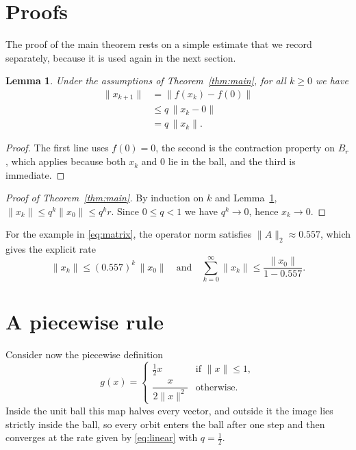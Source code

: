 \documentclass[10pt]{article}
\newtheorem{lemma}[theorem]{Lemma}
\theoremstyle{definition}
\begin{document}
\clearpage
\section{Proofs}

The proof of the main theorem rests on a simple estimate that we record
separately, because it is used again in the next section.

\begin{lemma}\label{lem:step}
Under the assumptions of Theorem~\ref{thm:main}, for all $k\ge 0$ we have
\begin{align}
  \|x_{k+1}\| &= \|f(x_k)-f(0)\|   \label{eq:step1}\\
              &\le q\,\|x_k-0\|    \label{eq:step2}\\
              &= q\,\|x_k\| .      \label{eq:step3}
\end{align}
\end{lemma}

\begin{proof}
The first line uses $f(0)=0$, the second is the contraction property on
$B_r$, which applies because both $x_k$ and $0$ lie in the ball, and the
third is immediate.
\end{proof}

\begin{proof}[Proof of Theorem~\ref{thm:main}]
By induction on $k$ and Lemma~\ref{lem:step}, $\|x_k\|\le q^k\|x_0\|\le
q^k r$. Since $0\le q<1$ we have $q^k\to 0$, hence $x_k\to 0$.
\end{proof}

For the example in \eqref{eq:matrix}, the operator norm satisfies
$\|A\|_2\approx 0.557$, which gives the explicit rate
\begin{equation}
  \|x_k\| \le (0.557)^k\,\|x_0\|
  \quad\text{and}\quad
  \sum_{k=0}^{\infty}\|x_k\| \le \frac{\|x_0\|}{1-0.557} .
  \label{eq:rate}
\end{equation}

\section{A piecewise rule}

Consider now the piecewise definition
\begin{equation}
  g(x) =
  \begin{cases}
    \tfrac12 x & \text{if } \|x\|\le 1,\\[2pt]
    \dfrac{x}{2\|x\|^2} & \text{otherwise.}
  \end{cases}
  \label{eq:piecewise}
\end{equation}
Inside the unit ball this map halves every vector, and outside it the image
lies strictly inside the ball, so every orbit enters the ball after one step
and then converges at the rate given by \eqref{eq:linear} with $q=\tfrac12$.
\end{document}
